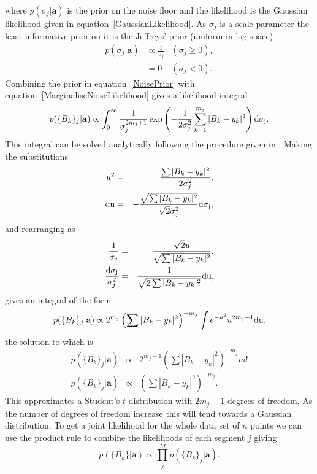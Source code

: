 where $p(\sigma_j|\mathbf{a})$ is the prior on the noise floor and the likelihood is the Gaussian
likelihood given in equation~\ref{GaussianLikelihood}. As $\sigma_j$ is a scale parameter the least
informative prior on it is the Jeffreys' prior (uniform in log space)
\begin{eqnarray}\label{NoisePrior}
p(\sigma_j|\mathbf{a}) & \propto \frac{1}{\sigma_j} & (\sigma_j \ge 0), \\
 & =0 & (\sigma_j < 0). \nonumber
\end{eqnarray}
Combining the prior in equation~\ref{NoisePrior} with equation~\ref{MarginaliseNoiseLikelihood}
gives a likelihood integral
\begin{equation}\label{NoiseIntegral}
p(\{B_k\}_j|\mathbf{a}) \propto \int_0^\infty
\frac{1}{\sigma_j^{2m_j+1}}\exp\left(-\frac{1}{2\sigma_j^2}\sum_{k=1}^{m_j}|B_k - y_k|^2\right)
\rm{d}\sigma_j.
\end{equation}
This integral can be solved analytically following the procedure given in \cite{Dupuis:2004}.
Making the substitutions
\begin{eqnarray}
u^2 & = & \frac{\sum{}|B_k-y_k|^2}{2\sigma_j^2}, \\
\rm{d}u & = & -\frac{\sqrt{\sum{}|B_k-y_k|^2}}{\sqrt{2}\sigma_j^2}\rm{d}\sigma_j, \nonumber
\end{eqnarray}
and rearranging as
\begin{eqnarray}
\frac{1}{\sigma_j} & = & \frac{\sqrt{2}u}{\sqrt{\sum{}|B_k-y_k|^2}}, \\
\frac{\rm{d}\sigma_j}{\sigma_j^2} & = & \frac{1}{\sqrt{2\sum{}|B_k-y_k|^2}}\rm{d}u, \nonumber
\end{eqnarray}
gives an integral of the form
\begin{equation}
p(\{B_k\}_j|\mathbf{a}) \propto 2^{m_j}\left(\sum{}|B_k -
y_k|^2\right)^{-m_j}\int{}e^{-u^2}u^{2m_j-1}\rm{d}u,
\end{equation}
the solution to which is
\begin{eqnarray}\label{StudentstLikelihood}
p(\{B_k\}_j|\mathbf{a}) & \propto & 2^{m_j-1}\left(\sum{}|B_k-y_k|^2\right)^{-m_j}m! \nonumber \\
p(\{B_k\}_j|\mathbf{a}) & \propto & \left(\sum{}|B_k-y_k|^2\right)^{-m_j}.
\end{eqnarray}
This approximates a Student's $t$-distribution with $2m_j-1$ degrees of freedom. As the number of
degrees of freedom increase this will tend towards a Gaussian distribution. To get a joint
likelihood for the whole data set of $n$ points we can use the product rule to combine the
likelihoods of each segment $j$ giving
\begin{equation}
p(\{B_k\}|\mathbf{a})\propto\prod_j^M p(\{B_k\}_j|\mathbf{a}).
\end{equation}

